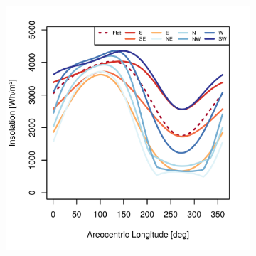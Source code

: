 \begin{figure}[h]
\vspace{-2ex}
\centering
    \setlength{\subfigureWidth}{0.50\textwidth}
    \setlength{\graphicsHeight}{80mm}
    \hypersetup{hidelinks=true}%
    \begin{subfigure}[t]{\subfigureWidth}
        \centering
            \includegraphics[height=\graphicsHeight]{sections/appendix/optimal-angles/plots/ismenius-cavus-tau-04-and-beta-optimal-based-on-direct-beam-irradiance-at-noon.png}
            \label{fig:sub:optimal-angles-ismenius-cavus-based-on-irradiance}
    \end{subfigure}\hfill
    \begin{subfigure}[t]{\subfigureWidth}
        \centering

\end{subfigure}
\end{figure}
